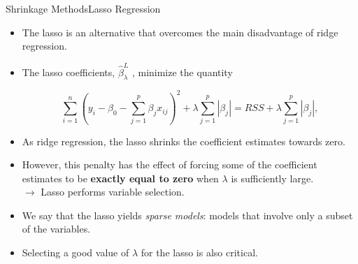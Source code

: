 \begin{frame}{Shrinkage Methods}{Lasso Regression}

\begin{itemize}
    \item The lasso is an alternative that overcomes the main disadvantage of ridge regression. \pause 
    
    \item The lasso coeﬃcients, $\hat{\beta}_\lambda^L$ , minimize the quantity \pause 

    \begin{equation} \label{eq:lasso}
        \sum_{i=1}^n (y_i - \beta_0 - \sum_{j=1}^p  \beta_j x_{ij} )^2 + \lambda \sum_{j=1}^p | \beta_j | = RSS + \lambda \sum_{j=1}^p | \beta_j |,
    \end{equation} \pause 

    \item As ridge regression, the lasso shrinks the coeﬃcient estimates towards zero. \pause 
    
    \item However, this penalty has the eﬀect of forcing some of the coeﬃcient estimates to be \textbf{exactly equal to zero} when $\lambda$ is suﬃciently large. \\ \pause 
    $\rightarrow$ Lasso performs variable selection. \pause 

    \item We say that the lasso yields \textit{sparse models}: models that involve only a subset of the variables. \pause

    \item Selecting a good value of $\lambda$ for the lasso is also critical. 
    
\end{itemize}
    
\end{frame}